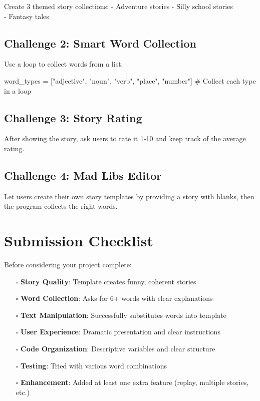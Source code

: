 \documentclass[
  letterpaper,
  DIV=11,
  numbers=noendperiod,
  oneside]{scrreprt}
\newenvironment{Shaded}{}{}
\newcommand{\CommentTok}[1]{\textcolor[rgb]{0.42,0.45,0.49}{#1}}
\newcommand{\NormalTok}[1]{\textcolor[rgb]{0.14,0.16,0.18}{#1}}
\newcommand{\OperatorTok}[1]{\textcolor[rgb]{0.14,0.16,0.18}{#1}}
\newcommand{\StringTok}[1]{\textcolor[rgb]{0.01,0.18,0.38}{#1}}
\providecommand{\tightlist}{%
  \setlength{\itemsep}{0pt}\setlength{\parskip}{0pt}}\usepackage{longtable,booktabs,array}
\begin{document}
Create 3 themed story collections: - Adventure stories - Silly school
stories\\
- Fantasy tales

\subsection{Challenge 2: Smart Word
Collection}\label{challenge-2-smart-word-collection}

Use a loop to collect words from a list:

\begin{Shaded}
\begin{Highlighting}[]
\NormalTok{word\_types }\OperatorTok{=}\NormalTok{ [}\StringTok{"adjective"}\NormalTok{, }\StringTok{"noun"}\NormalTok{, }\StringTok{"verb"}\NormalTok{, }\StringTok{"place"}\NormalTok{, }\StringTok{"number"}\NormalTok{]}
\CommentTok{\# Collect each type in a loop}
\end{Highlighting}
\end{Shaded}

\subsection{Challenge 3: Story Rating}\label{challenge-3-story-rating}

After showing the story, ask users to rate it 1-10 and keep track of the
average rating.

\subsection{Challenge 4: Mad Libs
Editor}\label{challenge-4-mad-libs-editor}

Let users create their own story templates by providing a story with
blanks, then the program collects the right words.

\section{Submission Checklist}\label{submission-checklist-1}

Before considering your project complete:

\begin{itemize}
\tightlist
\item[$\square$]
  \textbf{Story Quality}: Template creates funny, coherent stories
\item[$\square$]
  \textbf{Word Collection}: Asks for 6+ words with clear explanations
\item[$\square$]
  \textbf{Text Manipulation}: Successfully substitutes words into
  template
\item[$\square$]
  \textbf{User Experience}: Dramatic presentation and clear instructions
\item[$\square$]
  \textbf{Code Organization}: Descriptive variables and clear structure
\item[$\square$]
  \textbf{Testing}: Tried with various word combinations
\item[$\square$]
  \textbf{Enhancement}: Added at least one extra feature (replay,
  multiple stories, etc.)
\end{itemize}
\end{document}
